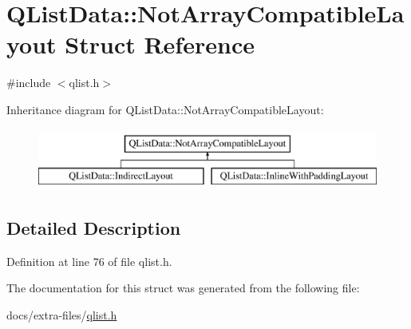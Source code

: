 \hypertarget{struct_q_list_data_1_1_not_array_compatible_layout}{}\section{Q\+List\+Data\+:\+:Not\+Array\+Compatible\+Layout Struct Reference}
\label{struct_q_list_data_1_1_not_array_compatible_layout}


{\ttfamily \#include $<$qlist.\+h$>$}

Inheritance diagram for Q\+List\+Data\+:\+:Not\+Array\+Compatible\+Layout\+:\begin{figure}[H]
\begin{center}
\leavevmode
\includegraphics[height=2.000000cm]{struct_q_list_data_1_1_not_array_compatible_layout}
\end{center}
\end{figure}


\subsection{Detailed Description}


Definition at line 76 of file qlist.\+h.



The documentation for this struct was generated from the following file\+:\begin{DoxyCompactItemize}
\item 
docs/extra-\/files/\hyperlink{qlist_8h}{qlist.\+h}\end{DoxyCompactItemize}
